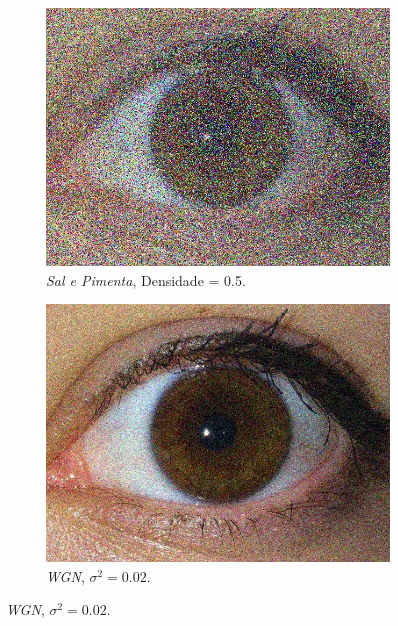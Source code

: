 \begin{figure}[H]
\begin{subfigure}{0.25\textwidth}
  \includegraphics[width=\linewidth]{img/Resultados/ruidos/impulse0,5.jpg}
  \caption{\textit{Sal e Pimenta}, Densidade = 0.5.}
\end{subfigure}\hfil %
\begin{subfigure}{0.25\textwidth}
  \includegraphics[width=\linewidth]{img/Resultados/ruidos/wgn0,02.jpg}
  \caption{\textit{\acrshort{WGN}}, $\sigma^2 = 0.02$.}
\end{subfigure}


\end{figure}

